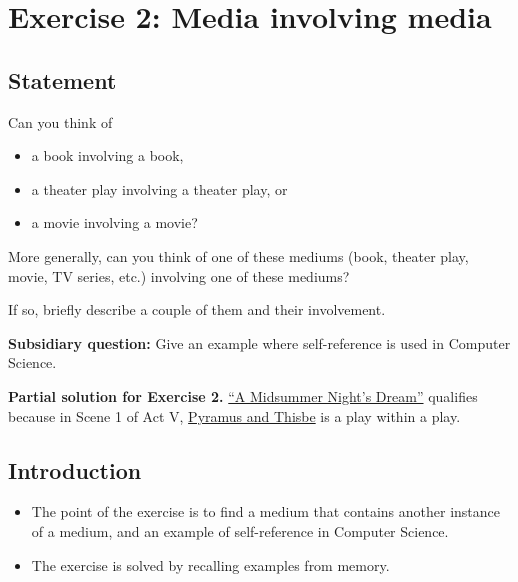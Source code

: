 \documentclass[12pt]{article}
\begin{document}

\newpage

\section{Exercise 2: Media involving media}


\subsection{Statement}

Can you think of

\begin{itemize}
\item a book involving a book,
\item a theater play involving a theater play, or
\item a movie involving a movie?
\end{itemize}

More generally, can you think of one of these mediums (book, theater play,
movie, TV series, etc.) involving one of these mediums?

If so, briefly describe a couple of them and their involvement.

\textbf{Subsidiary question:} Give an example where self-reference is used in
Computer Science.

\textbf{Partial solution for Exercise 2.}
\href{https://en.wikipedia.org/wiki/A_Midsummer_Night\%27s_Dream}{``A Midsummer Night's Dream''}
qualifies because in Scene 1 of Act V,
\href{https://en.wikipedia.org/wiki/Pyramus_and_Thisbe\#Adaptations}{Pyramus and Thisbe}
is a play within a play.


\subsection{Introduction}

\begin{itemize}

\item
  The point of the exercise is to find a medium that contains another instance of a medium, and an example of self-reference in Computer Science.

\item
  The exercise is solved by recalling examples from memory.

\end{itemize}
\end{document}
